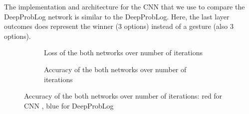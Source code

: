     The implementation and architecture for the CNN that we use to compare the DeepProbLog network is similar to the DeepProbLog. Here, the last layer outcomes does represent the winner (3 options) instead of a gesture (also 3 options).


\begin{figure}[h]
    \centering
    \begin{subfigure}[b]{0.49\textwidth}
        \caption{Loss of the both networks over number of iterations}
    \end{subfigure}
    \hfill
    \begin{subfigure}[b]{0.49\textwidth}
        \caption{Accuracy of the both networks over number of iterations}
    \end{subfigure}
    \caption{Accuracy of the both networks over number of iterations: red for CNN , blue for DeepProbLog}
\end{figure}  
